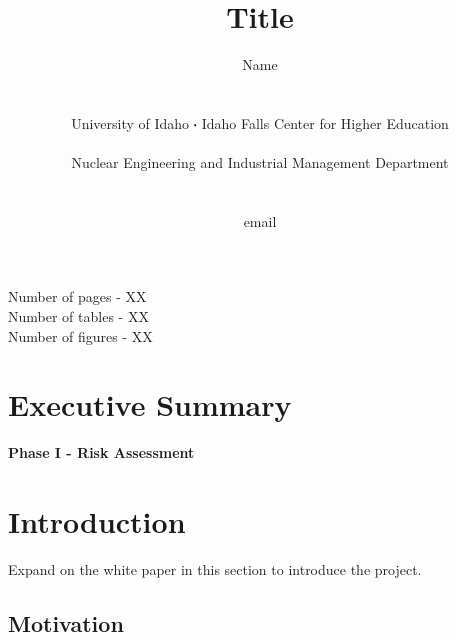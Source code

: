 \documentclass[11pt,a4paper]{article}
\newcommand*\sq{\mathbin{\vcenter{\hbox{\rule{.3ex}{.3ex}}}}} %
\begin{document}
\begin{titlepage}
    \title{Title}
    \author{
        Name
        \\ \\ \\
        University of Idaho $\sq$ Idaho Falls Center for Higher Education
        \\ \\
        Nuclear Engineering and Industrial Management Department
        \\ \\ \\
        email 
    }
\clearpage %
\maketitle
\vspace*{\fill}
\begin{flushright}{
        \noindent Number of pages - XX \\
        \noindent Number of tables - XX \\
        \noindent Number of figures - XX
}
\end{flushright}
\thispagestyle{empty} %
\end{titlepage}

\onehalfspacing
\linenumbers
\pagewiselinenumbers
\modulolinenumbers[3] %

\section*{Executive Summary} \label{exec-summ} 

\newpage

\begin{center}
    \textbf{\Large Phase I - Risk Assessment}
\end{center}

\newpage

\section{Introduction} \label{introduction}
Expand on the white paper in this section to introduce the project.

\subsection{Motivation}
\end{document}
